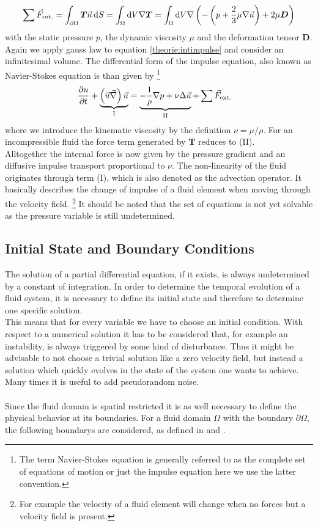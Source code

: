 \begin{align}
    \sum \vec{F}_{int.} = \int_{\partial \Omega} \bm{T}\vec{n} \mathop{}\!\mathrm{d} S = \int_{\Omega} \mathop{}\!\mathrm{d} V \nabla \bm{T} =
     \int_{\Omega} \mathop{}\!\mathrm{d} V \nabla \left(- \left(p + \frac{2}{3}\mu\nabla\vec{u} \right) + 2\mu \bm{D} \right)
\end{align}
with the static pressure $p$, the dynamic viscosity $\mu$ and the deformation tensor $\bm{D}$.
Again we apply gauss law to equation \ref{theorie:intimpulse} and consider an infinitesimal volume.
The differential form of the impulse equation, also known as Navier-Stokes equation is than given by
\footnote{The term Navier-Stokes equation is generally referred to as the complete set of equations of motion or
just the impulse equation here we use the latter convention.}
\begin{align}
    \label{theorie:eqns}
    \pdn[u]{t} + \underbrace{\left(\vec{u} \vec{\nabla}\right) \vec{u}}_{\text{I}} &= \underbrace{- \frac{1}{\rho} \nabla p + \nu \Delta \vec{u}}_{\text{II}} +\sum \vec{F}_{\text{ext.}}
\end{align}
where we introduce the kinematic viscosity by the definition $\nu = \mu/\rho$.
For an incompressible fluid the force term generated by $\bm{T}$ reduces to (II).\\
Alltogether the internal force is now given by the pressure gradient and an diffusive impulse transport proportional to $\nu$.
The non-linearity of the fluid originates through term (I), which is also denoted as the advection operator.
It basically describes the change of impulse of a fluid element when moving through the velocity field.
\footnote{For example the velocity of a fluid element will change when no forces but a velocity field is present.}
It should be noted that the set of equations is not yet solvable as the pressure variable is still undetermined.

\subsection{Initial State and Boundary Conditions}

The solution of a partial differential equation, if it exists, is always undetermined by a constant of integration.
In order to determine the temporal evolution of a fluid system, it is necessary to define its initial state and therefore
to determine one specific solution.\\
This means that for every variable we have to choose an initial condition.
With respect to a numerical solution it has to be considered that, for example an instability, is always triggered by some kind of disturbance.
Thus it might be advisable to not choose a trivial solution like a zero velocity field, but instead a solution which quickly evolves in the state
of the system one wants to achieve. Many times it is useful to add pseudorandom noise.\\
\\
Since the fluid domain is spatial restricted it is as well necessary to define the physical behavior at its boundaries.
For a fluid domain $\Omega$ with the boundary $\partial \Omega$, the following boundarys are considered, as defined in \citep{Griebel1998} and \citep{ferziger99}.

